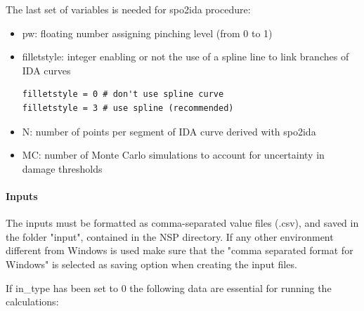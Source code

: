 The last set of variables is needed for spo2ida procedure:

\begin{itemize}
\item pw: floating number assigning pinching level (from 0 to 1)
\item filletstyle: integer enabling or not the use of a spline line to link branches of IDA curves

\begin{Verbatim}[frame=single, commandchars=\\\{\}, samepage=true]
filletstyle = 0 # don't use spline curve
filletstyle = 3 # use spline (recommended)
\end{Verbatim}

\item N: number of points per segment of IDA curve derived with spo2ida
\item MC: number of Monte Carlo simulations to account for uncertainty in damage thresholds
\end{itemize}

\paragraph{Inputs}
The inputs must be formatted as comma-separated value files (.csv), and saved in the folder "input", contained in the NSP directory. If any other environment different from Windows is used make sure that the "comma separated format for Windows" is selected as saving option when creating the input files.

If in\_type has been set to 0 the following data are essential for running the calculations:

